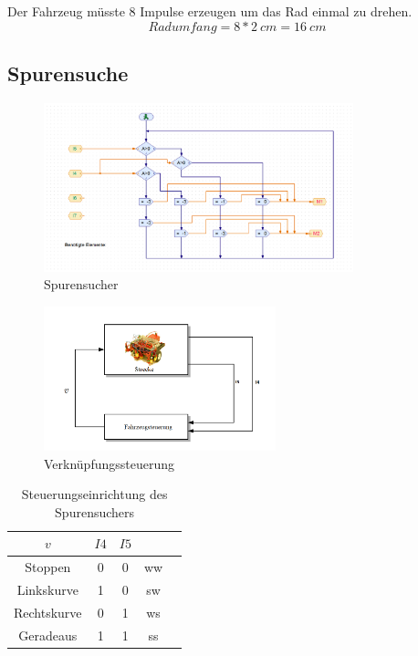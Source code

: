 \documentclass[a4paper, 12pt]{article}
\begin{document}
Der Fahrzeug müsste 8 Impulse erzeugen um das Rad einmal zu drehen. 
\[ Radumfang = 8 * 2 \ cm = 16 \ cm   \]



\pagebreak
\subsection*{Spurensuche}


\begin{figure}[h]
\centering
\includegraphics[width=0.8\textwidth]{images/abb_54.PNG}
\caption{Spurensucher}
\label{fig:}
\end{figure}


\begin{figure}[H]
\centering
\includegraphics[width=0.6\textwidth]{images/abb_steuerung.png}
\caption{Verknüpfungssteuerung}
\label{fig:Verknüpfungssteuerung}
\end{figure}


\begin{table}[h]
  \centering\begin{tabular}{|c|c|c|c|c|}
    \hline 
    \( v  \) & \( I4  \) & \( I5  \) \\ \hline
    Stoppen & 0 & 0 & ww                                                    \\ \hline  
    Linkskurve & 1 & 0 & sw                                                  \\ \hline
    Rechtskurve & 0 & 1 & ws                                                  \\ \hline
    Geradeaus & 1 & 1 & ss                                                     \\ \hline
  \end{tabular}
  \caption{Steuerungseinrichtung des Spurensuchers}
  \label{<label>}
\end{table}
\end{document}
